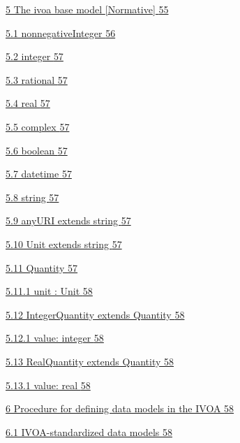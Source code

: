 \documentclass[10pt,a4paper]{ivoa}
\begin{document}
\protect\hyperlink{the-ivoa-base-model-normative}{5 The ivoa base model
{[}Normative{]} \protect\hyperlink{the-ivoa-base-model-normative}{55}}

\protect\hyperlink{nonnegativeinteger}{5.1 nonnegativeInteger
\protect\hyperlink{nonnegativeinteger}{56}}

\protect\hyperlink{integer}{5.2 integer \protect\hyperlink{integer}{57}}

\protect\hyperlink{rational}{5.3 rational
\protect\hyperlink{rational}{57}}

\protect\hyperlink{real}{5.4 real \protect\hyperlink{real}{57}}

\protect\hyperlink{complex}{5.5 complex \protect\hyperlink{complex}{57}}

\protect\hyperlink{boolean}{5.6 boolean \protect\hyperlink{boolean}{57}}

\protect\hyperlink{datetime}{5.7 datetime
\protect\hyperlink{datetime}{57}}

\protect\hyperlink{string}{5.8 string \protect\hyperlink{string}{57}}

\protect\hyperlink{anyuri-extends-string}{5.9 anyURI extends string
\protect\hyperlink{anyuri-extends-string}{57}}

\protect\hyperlink{unit-extends-string}{5.10 Unit extends string
\protect\hyperlink{unit-extends-string}{57}}

\protect\hyperlink{quantity}{5.11 Quantity
\protect\hyperlink{quantity}{57}}

\protect\hyperlink{unit-unit}{5.11.1 unit : Unit
\protect\hyperlink{unit-unit}{58}}

\protect\hyperlink{integerquantity-extends-quantity}{5.12
IntegerQuantity extends Quantity
\protect\hyperlink{integerquantity-extends-quantity}{58}}

\protect\hyperlink{value-integer}{5.12.1 value: integer
\protect\hyperlink{value-integer}{58}}

\protect\hyperlink{realquantity-extends-quantity}{5.13 RealQuantity
extends Quantity \protect\hyperlink{realquantity-extends-quantity}{58}}

\protect\hyperlink{value-real}{5.13.1 value: real
\protect\hyperlink{value-real}{58}}

\protect\hyperlink{procedure-for-defining-data-models-in-the-ivoa}{6
Procedure for defining data models in the IVOA
\protect\hyperlink{procedure-for-defining-data-models-in-the-ivoa}{58}}

\protect\hyperlink{ivoa-standardized-data-models}{6.1 IVOA-standardized
data models \protect\hyperlink{ivoa-standardized-data-models}{58}}
\end{document}
